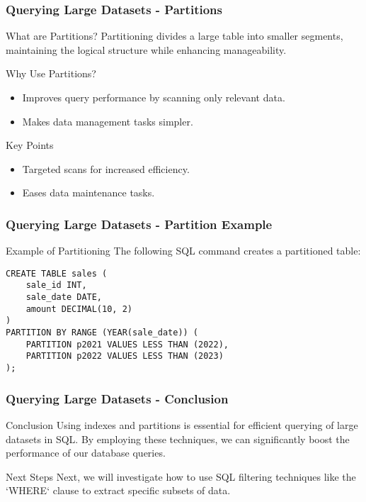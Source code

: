 \documentclass{beamer}
\begin{document}
\begin{frame}
    \frametitle{Querying Large Datasets - Partitions}
    \begin{block}{What are Partitions?}
        Partitioning divides a large table into smaller segments, maintaining the logical structure while enhancing manageability.
    \end{block}
    
    \begin{block}{Why Use Partitions?}
        \begin{itemize}
            \item Improves query performance by scanning only relevant data.
            \item Makes data management tasks simpler.
        \end{itemize}
    \end{block}
    
    \begin{block}{Key Points}
        \begin{itemize}
            \item Targeted scans for increased efficiency.
            \item Eases data maintenance tasks.
        \end{itemize}
    \end{block}
\end{frame}

\begin{frame}[fragile]
    \frametitle{Querying Large Datasets - Partition Example}
    \begin{block}{Example of Partitioning}
        The following SQL command creates a partitioned table:
        \begin{lstlisting}
CREATE TABLE sales (
    sale_id INT,
    sale_date DATE,
    amount DECIMAL(10, 2)
)
PARTITION BY RANGE (YEAR(sale_date)) (
    PARTITION p2021 VALUES LESS THAN (2022),
    PARTITION p2022 VALUES LESS THAN (2023)
);
        \end{lstlisting}
    \end{block}
\end{frame}

\begin{frame}
    \frametitle{Querying Large Datasets - Conclusion}
    \begin{block}{Conclusion}
        Using indexes and partitions is essential for efficient querying of large datasets in SQL.
        By employing these techniques, we can significantly boost the performance of our database queries.
    \end{block}
    
    \begin{block}{Next Steps}
        Next, we will investigate how to use SQL filtering techniques like the `WHERE` clause to extract specific subsets of data.
    \end{block}
\end{frame}
\end{document}
